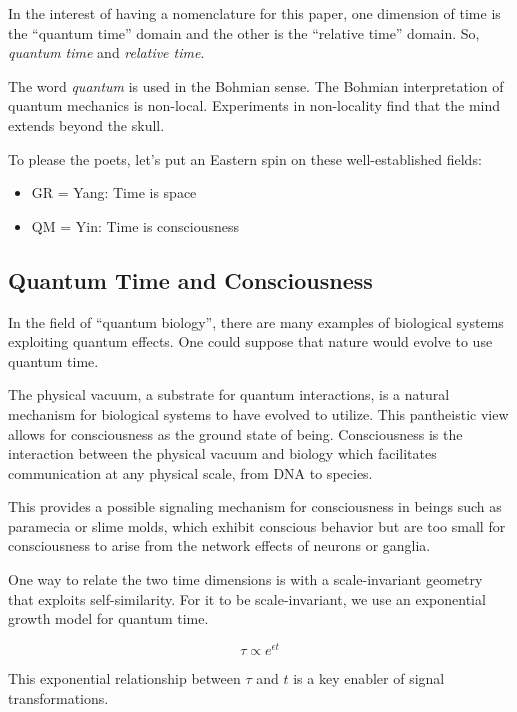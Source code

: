 In the interest of having a nomenclature for this paper, one dimension of time
is the ``quantum time'' domain and the other is the ``relative time'' domain.
So, \textit{quantum time} and \textit{relative time}.

The word \textit{quantum} is used in the Bohmian sense.
The Bohmian interpretation of quantum mechanics is non-local.
Experiments in non-locality \cite{Achterberg} find that the mind extends beyond
the skull. 

To please the poets, let's put an Eastern spin on these 
well-established fields:

\begin{itemize}
  \item GR = Yang: Time is space
  \item QM = Yin: Time is consciousness
\end{itemize}

\subsection{Quantum Time and Consciousness}

In the field of ``quantum biology'',
there are many examples of biological systems exploiting quantum effects.
One could suppose that nature would evolve to use quantum time.

The physical vacuum, a substrate for quantum interactions,
is a natural mechanism for biological systems to have evolved to utilize.
This pantheistic view allows for consciousness as the ground state of being.
Consciousness is the interaction between the physical vacuum and biology which
facilitates communication at any physical scale, from DNA to species.

This provides a possible signaling mechanism for consciousness in beings such
as paramecia or slime molds, which exhibit conscious behavior but are too small
for consciousness to arise from the network effects of neurons or ganglia.

One way to relate the two time dimensions is with a scale-invariant geometry
that exploits self-similarity.
For it to be scale-invariant,
we use an exponential growth model for quantum time.

\begin{equation} \label{eq:pink}
\tau \propto e^{\epsilon t}
\end{equation}

This exponential relationship between $\tau$ and $t$
is a key enabler of signal transformations.

